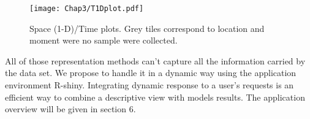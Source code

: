 \begin{figure}[ht]
    \centering
    \texttt{[image: Chap3/T1Dplot.pdf]}
    \caption{Space (1-D)/Time plots. Grey tiles correspond to location and moment were no sample were collected.}
    \label{fig:S1Dplot}
\end{figure}

All of those representation methods can't capture all the information carried by the data set. We propose to handle it in a dynamic way using the application environment R-shiny. Integrating dynamic response to a user's requests is an efficient way to combine a descriptive view with models results. The application overview will be given in section 6.
